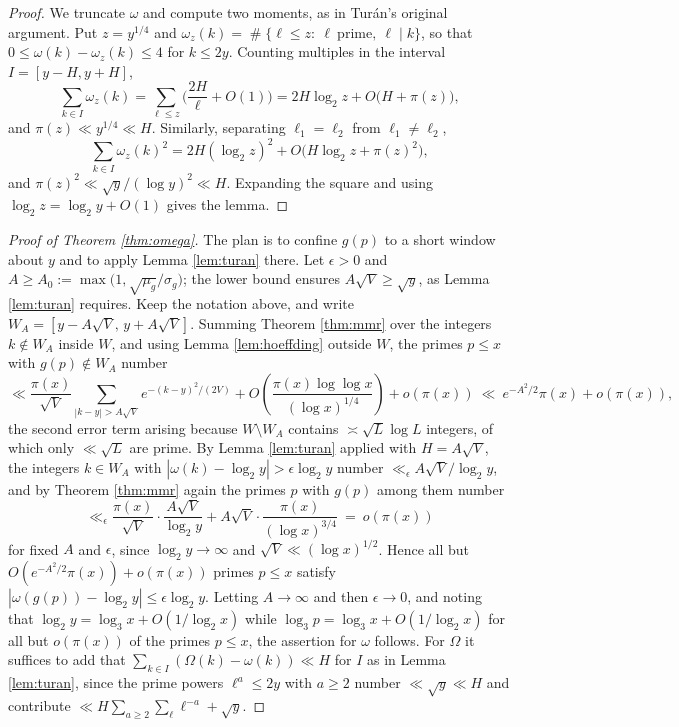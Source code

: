 \documentclass[11pt,reqno]{amsart}
\theoremstyle{plain}
\theoremstyle{definition}
\DeclareMathOperator{\Card}{\#}
\begin{document}
\begin{proof}
We truncate $\omega$ and compute two moments, as in Tur\'an's original argument. Put $z=y^{1/4}$ and $\omega_z(k)=\Card\{\ell\le z:\ \ell\ \text{prime},\ \ell\mid k\}$, so that $0\le\omega(k)-\omega_z(k)\le4$ for $k\le2y$. Counting multiples in the interval $I=[y-H,y+H]$,
\[
\sum_{k\in I}\omega_z(k)=\sum_{\ell\le z}\Big(\frac{2H}{\ell}+O(1)\Big)=2H\log_2z+O\big(H+\pi(z)\big),
\]
and $\pi(z)\ll y^{1/4}\ll H$. Similarly, separating $\ell_1=\ell_2$ from $\ell_1\ne\ell_2$,
\[
\sum_{k\in I}\omega_z(k)^{2}=2H(\log_2z)^{2}+O\big(H\log_2z+\pi(z)^{2}\big),
\]
and $\pi(z)^{2}\ll\sqrt y/(\log y)^{2}\ll H$. Expanding the square and using $\log_2z=\log_2y+O(1)$ gives the lemma.
\end{proof}

\begin{proof}[Proof of Theorem \ref{thm:omega}]
The plan is to confine $g(p)$ to a short window about $y$ and to apply Lemma \ref{lem:turan} there. Let $\epsilon>0$ and $A\ge A_0:=\max\big(1,\sqrt{\mu_g}/\sigma_g\big)$; the lower bound ensures $A\sqrt V\ge\sqrt y$, as Lemma \ref{lem:turan} requires. Keep the notation above, and write $W_A=[y-A\sqrt V,\,y+A\sqrt V]$. Summing Theorem \ref{thm:mmr} over the integers $k\notin W_A$ inside $W$, and using Lemma \ref{lem:hoeffding} outside $W$, the primes $p\le x$ with $g(p)\notin W_A$ number
\[
\ll\frac{\pi(x)}{\sqrt V}\sum_{|k-y|>A\sqrt V}e^{-(k-y)^{2}/(2V)}+O\!\left(\frac{\pi(x)\log\log x}{(\log x)^{1/4}}\right)+o(\pi(x))\ \ll\ e^{-A^{2}/2}\pi(x)+o(\pi(x)),
\]
the second error term arising because $W\setminus W_A$ contains $\asymp\sqrt L\log L$ integers, of which only $\ll\sqrt L$ are prime. By Lemma \ref{lem:turan} applied with $H=A\sqrt V$, the integers $k\in W_A$ with $|\omega(k)-\log_2y|>\epsilon\log_2y$ number $\ll_\epsilon A\sqrt V/\log_2y$, and by Theorem \ref{thm:mmr} again the primes $p$ with $g(p)$ among them number
\[
\ll_\epsilon\frac{\pi(x)}{\sqrt V}\cdot\frac{A\sqrt V}{\log_2y}+A\sqrt V\cdot\frac{\pi(x)}{(\log x)^{3/4}}\ =\ o(\pi(x))
\]
for fixed $A$ and $\epsilon$, since $\log_2y\to\infty$ and $\sqrt V\ll(\log x)^{1/2}$. Hence all but $O(e^{-A^{2}/2}\pi(x))+o(\pi(x))$ primes $p\le x$ satisfy $|\omega(g(p))-\log_2y|\le\epsilon\log_2y$. Letting $A\to\infty$ and then $\epsilon\to0$, and noting that $\log_2y=\log_3x+O(1/\log_2x)$ while $\log_3p=\log_3x+O(1/\log_2x)$ for all but $o(\pi(x))$ of the primes $p\le x$, the assertion for $\omega$ follows. For $\Omega$ it suffices to add that $\sum_{k\in I}(\Omega(k)-\omega(k))\ll H$ for $I$ as in Lemma \ref{lem:turan}, since the prime powers $\ell^{a}\le2y$ with $a\ge2$ number $\ll\sqrt y\ll H$ and contribute $\ll H\sum_{a\ge2}\sum_\ell\ell^{-a}+\sqrt y$.
\end{proof}
\end{document}
